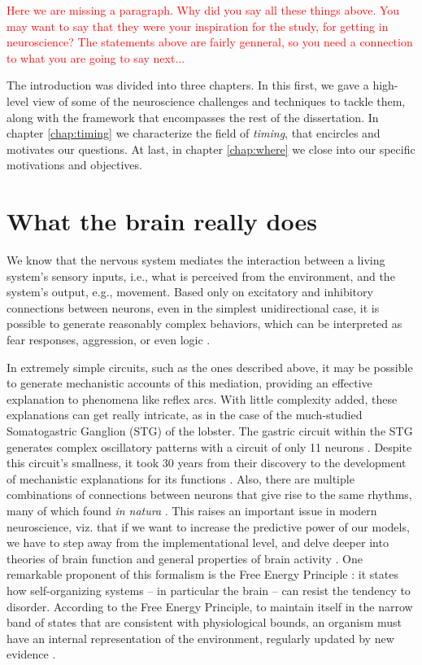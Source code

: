 \textcolor{red}{Here we are missing a paragraph. Why did you say all these things above. You may want to say that they were your inspiration for the study, for getting in neuroscience? The statements above are fairly genneral, so you need a connection to what you are going to say next... }

The introduction was divided into three chapters. In this first, we gave a high-level view of some of the neuroscience challenges and techniques to tackle them, along with the framework that encompasses the rest of the dissertation. In chapter \ref{chap:timing} we characterize the field of \textit{timing}, that encircles and motivates our questions. At last, in chapter \ref{chap:where} we close into our specific motivations and objectives.

\section{What the brain really does}
\label{sec:theory}
    We know that the nervous system mediates the interaction between a living system's sensory inputs, i.e., what is perceived from the environment, and the system's output, e.g., movement. Based only on excitatory and inhibitory connections between neurons, even in the simplest unidirectional case, it is possible to generate reasonably complex behaviors, which can be interpreted as fear responses, aggression, or even logic \cite{braitenberg1986vehicles}. %
    
    In extremely simple circuits, such as the ones described above, it may be possible to generate mechanistic accounts of this mediation, providing an effective explanation to phenomena like reflex arcs. With little complexity added, these explanations can get really intricate, as in the case of the much-studied Somatogastric Ganglion (STG) of the lobster. The gastric circuit within the STG generates complex oscillatory patterns with a circuit of only 11 neurons \cite{selverston2009neural}. Despite this circuit's smallness, it took 30 years from their discovery to the development of mechanistic explanations for its functions \cite{bal1988pyloric, selverston2009neural}. Also, there are multiple combinations of connections between neurons that give rise to the same rhythms, many of which  found \textit{in natura} \cite{prinz2004similar}. %
    This raises an important issue in modern neuroscience, viz. that if we want to increase the predictive power of our models, we have to step away from the implementational level, and delve deeper into theories of brain function and general properties of brain activity \cite{gerstner2012theory}. One remarkable proponent of this formalism is the Free Energy Principle \cite{friston2009free}: it states how self-organizing systems -- in particular the brain -- can resist the tendency to disorder. According to the Free Energy Principle, to maintain itself in the narrow band of states that are consistent with physiological bounds, an organism must have an internal representation of the environment, regularly updated by new evidence \cite{friston2009free}.

